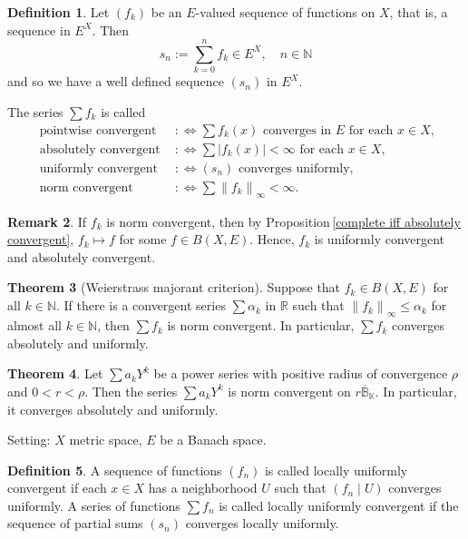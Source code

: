 \documentclass[12pt,a4paper]{book}
\theoremstyle{definition}
\newtheorem{defn}{Definition}[section]
\newtheorem{theo}[defn]{Theorem}
\newtheorem{rema}[defn]{Remark}
\begin{document}
\begin{defn}
    Let $\left(f_k\right)$ be an $E$-valued sequence of functions on $X$, that is, a sequence in $E^X$. Then
    $$
    s_n:=\sum_{k=0}^n f_k \in E^X, \quad n \in \mathbb{N}
    $$
    and so we have a well defined sequence $\left(s_n\right)$ in $E^X$. 
    
    The series $\sum f_k$ is called   
    $$
    \begin{aligned}
    \text { pointwise convergent } & : \Leftrightarrow \sum f_k(x) \text { converges in } E \text { for each } x \in X, \\
    \text { absolutely convergent } & : \Leftrightarrow \sum\left|f_k(x)\right|<\infty \text { for each } x \in X, \\
    \text { uniformly convergent } & : \Leftrightarrow\left(s_n\right) \text { converges uniformly, } \\
    \text { norm convergent } & : \Leftrightarrow \sum\left\|f_k\right\|_{\infty}<\infty .
    \end{aligned}
    $$
\end{defn}
\begin{rema}
    If $f_k$ is norm convergent, then by Proposition\,\ref{complete iff absolutely convergent}, $f_k\mapsto f$ for some $f\in B(X,E)$. 
    Hence, $f_k$ is uniformly convergent and absolutely convergent.
\end{rema}
\begin{theo}[Weierstrass majorant criterion]
    Suppose that $f_k \in B(X, E)$ for all $k \in \mathbb{N}$. If there is a convergent series $\sum \alpha_k$ in $\mathbb{R}$ such that $\left\|f_k\right\|_{\infty} \leq \alpha_k$ for almost all $k \in \mathbb{N}$, then $\sum f_k$ is norm convergent. In particular, $\sum f_k$ converges absolutely and uniformly.
\end{theo}
\begin{theo}
    Let $\sum a_k Y^k$ be a power series with positive radius of convergence $\rho$ and $0<r<\rho$. Then the series $\sum a_k Y^k$ is norm convergent on $r \overline{\mathbb{B}}_{\mathbb{K}}$. In particular, it converges absolutely and uniformly.
\end{theo}
Setting: $X$ metric space, $E$ be a Banach space. 
\begin{defn}
    A sequence of functions $\left(f_n\right)$ is called locally uniformly convergent if each $x \in X$ has a neighborhood $U$ such that $\left(f_n \mid U\right)$ converges uniformly. A series of functions $\sum f_n$ is called locally uniformly convergent if the sequence of partial sums $\left(s_n\right)$ converges locally uniformly.
\end{defn}
\end{document}
